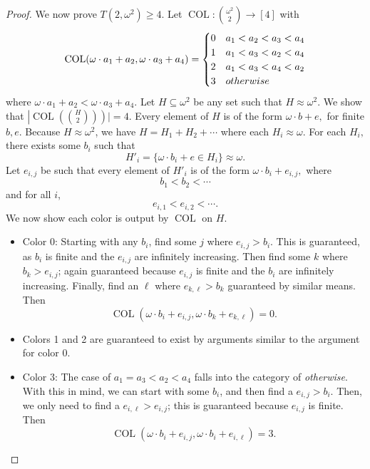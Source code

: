 \documentclass[10pt,a4paper]{amsart}
\newcommand{\COL}{\operatorname{COL}}
\newcommand{\commonconst}{a}
\newcommand{\oequiv}{\approx}
\newcommand{\om}{\omega}
\newcommand{\rareconst}{b}
\begin{document}
\begin{proof}
We now prove $T\left(2, \om^2\right) \geq  4$.
Let $\COL \colon \binom{\om^2}{2} \to [4]$ with \begin{align*}
\COL(\om \cdot \commonconst_1 + \commonconst_2, \om \cdot \commonconst_3 + \commonconst_4) = 
\begin{cases}
0 & \commonconst_1 < \commonconst_2 < \commonconst_3 < \commonconst_4\\
1 & \commonconst_1 < \commonconst_3 < \commonconst_2 < \commonconst_4\\
2 & \commonconst_1 < \commonconst_3 < \commonconst_4 < \commonconst_2\\
3 & \textnormal{otherwise}
\end{cases}
\end{align*}
where $\om \cdot \commonconst_1 + \commonconst_2 < \om \cdot \commonconst_3 + \commonconst_4$. 
Let $H \subseteq \omega^2$ be any set such that $H\oequiv \omega^2$. 
We show that $\left|\COL\left(\binom{H}{2}\right)\right)|=4$. Every element of $H$ is of the form $\omega \cdot \rareconst + e,$ for finite $\rareconst,e.$ Because $H \oequiv \om^2$, we have $H = H_1+H_2+ \cdots$ where each $H_i \oequiv \omega$. For each $H_i,$ there exists some $\rareconst_i$ such that $$
H'_i = \{\omega \cdot \rareconst_i + e \in H_i\} \oequiv \om.
$$ Let $e_{i,j}$ be such that every element of $H'_i$ is of the form $\omega \cdot \rareconst_i + e_{i,j},$
where
$$\rareconst_1 < \rareconst_2 < \cdots$$
and for all $i$, 
$$e_{i,1} < e_{i,2} < \cdots.$$
We now show each color is output by $\COL$ on $H$.
\begin{itemize}
    \item Color 0: Starting with any $\rareconst_i$, find some $j$ where $e_{i, j} > \rareconst_i$. This is guaranteed, as $\rareconst_i$ is finite and the $e_{i, j}$ are infinitely increasing. Then find some $k$ where $\rareconst_k > e_{i, j}$; again guaranteed because $e_{i, j}$ is finite and the $\rareconst_i$ are infinitely increasing. Finally, find an
    $\ell$ where $e_{k ,\ell} > \rareconst_k$ guaranteed by similar means. Then 
    $$\COL(\omega\cdot \rareconst_i + e_{i, j}, \omega\cdot \rareconst_k + e_{k, \ell})=0.$$
    \item Colors 1 and 2 are guaranteed to exist by arguments similar to the argument for color 0.
    \item Color 3: The case of $\commonconst_1=\commonconst_3<\commonconst_2<\commonconst_4$ falls into the category of {\it otherwise}. With this in mind, we can start with some $\rareconst_i$, and then find a $e_{i, j} > \rareconst_i$. Then, we only need to find a $e_{i, \ell} > e_{i, j}$; this is guaranteed because $e_{i, j}$ is finite. Then $$\COL(\omega\cdot \rareconst_i + e_{i, j}, \omega\cdot \rareconst_i + e_{i, \ell})=3.$$
\end{itemize}

 
\end{proof}
\end{document}
